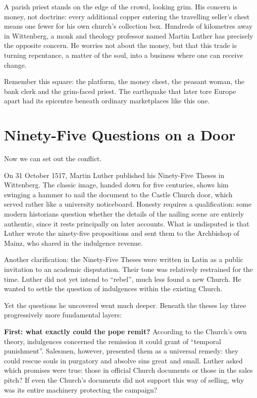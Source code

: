 A parish priest stands on the edge of the crowd, looking grim. His concern is money, not doctrine: every additional copper entering the travelling seller's chest means one fewer for his own church's collection box. Hundreds of kilometres away in Wittenberg, a monk and theology professor named Martin Luther has precisely the opposite concern. He worries not about the money, but that this trade is turning repentance, a matter of the soul, into a business where one can receive change.

Remember this square: the platform, the money chest, the peasant woman, the bank clerk and the grim-faced priest. The earthquake that later tore Europe apart had its epicentre beneath ordinary marketplaces like this one.

\section{Ninety-Five Questions on a Door}
Now we can set out the conflict.

On 31 October 1517, Martin Luther published his Ninety-Five Theses in Wittenberg. The classic image, handed down for five centuries, shows him swinging a hammer to nail the document to the Castle Church door, which served rather like a university noticeboard. Honesty requires a qualification: some modern historians question whether the details of the nailing scene are entirely authentic, since it rests principally on later accounts. What is undisputed is that Luther wrote the ninety-five propositions and sent them to the Archbishop of Mainz, who shared in the indulgence revenue.

Another clarification: the Ninety-Five Theses were written in Latin as a public invitation to an academic disputation. Their tone was relatively restrained for the time. Luther did not yet intend to ``rebel'', much less found a new Church. He wanted to settle the question of indulgences within the existing Church.

Yet the questions he uncovered went much deeper. Beneath the theses lay three progressively more fundamental layers:

\textbf{First: what exactly could the pope remit?} According to the Church's own theory, indulgences concerned the remission it could grant of ``temporal punishment''. Salesmen, however, presented them as a universal remedy: they could rescue souls in purgatory and absolve sins great and small. Luther asked which promises were true: those in official Church documents or those in the sales pitch? If even the Church's documents did not support this way of selling, why was its entire machinery protecting the campaign?

